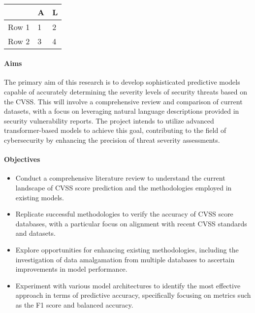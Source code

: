 \documentclass[11pt]{article}
\begin{document}
 \\



\begin{table}
	\caption{}
	\label{table:label}
	\begin{center}
		\begin{tabular}{l|l|l}\textbf{} & \textbf{A} & \textbf{L} \\
               \hline
               Row 1            & 1          & 2          \\
               Row 2            & 3          & 4          \\
		\end{tabular}
	\end{center}
\end{table}




\paragraph{Aims}
The primary aim of this research is to develop sophisticated predictive models capable of accurately determining
the severity levels of security threats based on the CVSS. This will involve a comprehensive review and comparison
of current datasets, with a focus on leveraging natural language descriptions provided in security vulnerability reports.
The project intends to utilize advanced transformer-based models to achieve this goal, contributing to the field of
cybersecurity by enhancing the precision of threat severity assessments.

\paragraph{Objectives}
\begin{itemize}[noitemsep]
	\item Conduct a comprehensive literature review to understand the current landscape of CVSS score prediction and the methodologies employed in existing models.
	\item Replicate successful methodologies to verify the accuracy of CVSS score databases, with a particular focus on alignment with recent CVSS standards and datasets.
	\item Explore opportunities for enhancing existing methodologies, including the investigation of data amalgamation from multiple databases to ascertain improvements in model performance.
	\item Experiment with various model architectures to identify the most effective approach in terms of predictive accuracy, specifically focusing on metrics such as the F1 score and balanced accuracy.
\end{itemize}
\end{document}
